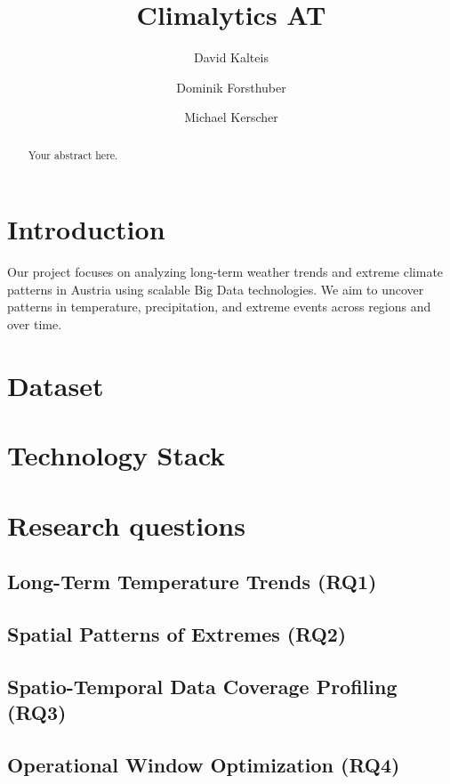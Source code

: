 \documentclass[sigconf]{acmart}
\title{Climalytics AT}
\author{David Kalteis}
\affiliation{\institution{FH Hagenberg}\department{Mobile Computing}\country{Austria}}
\author{Dominik Forsthuber}
\affiliation{\institution{FH Hagenberg}\department{Mobile Computing}\country{Austria}}
\author{Michael Kerscher}
\affiliation{\institution{FH Hagenberg}\department{Mobile Computing}\country{Austria}}
\begin{document}
\begin{abstract}
Your abstract here.
\end{abstract}

\maketitle

\section{Introduction}
Our project focuses on analyzing long-term weather trends and extreme climate patterns in Austria using scalable Big Data technologies. We aim to uncover patterns in temperature, precipitation, and extreme events across regions and over time.

\section{Dataset}


\section{Technology Stack}


\section{Research questions}
\subsection{Long-Term Temperature Trends (RQ1)}


\subsection{Spatial Patterns of Extremes (RQ2)}


\subsection{Spatio-Temporal Data Coverage Profiling (RQ3)}


\subsection{Operational Window Optimization (RQ4)}




\end{document}
